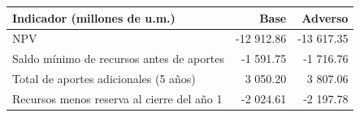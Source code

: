 \begin{tabular}{lrr}
\toprule
Indicador (millones de u.m.) & Base & Adverso \\
\midrule
NPV & -12 912.86 & -13 617.35 \\
Saldo mínimo de recursos antes de aportes & -1 591.75 & -1 716.76 \\
Total de aportes adicionales (5 años) & 3 050.20 & 3 807.06 \\
Recursos menos reserva al cierre del año 1 & -2 024.61 & -2 197.78 \\
\bottomrule
\end{tabular}
